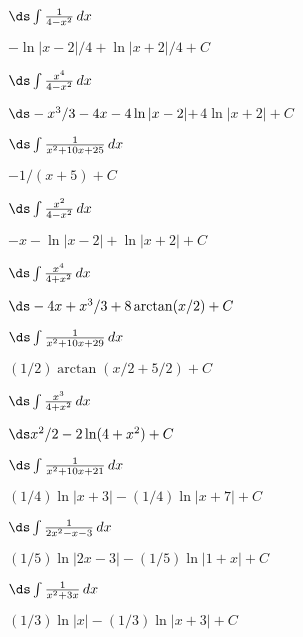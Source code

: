 \begin{enumialphparenastyle}

\begin{ex}
 $\ds\int {1\over 4-x^2}\,dx$
\begin{sol}
 $-\ln|x-2|/4+\ln|x+2|/4+C$
\end{sol}
\end{ex}

\begin{ex}
 $\ds\int {x^4\over 4-x^2}\,dx$
\begin{sol}
 $\ds -x^3/3-4x-4\ln|x-2|+$\hfill\break$4\ln|x+2| +C$
\end{sol}
\end{ex}

\begin{ex}
 $\ds\int {1\over x^2+10x+25}\,dx$
\begin{sol}
 $-1/(x+5) +C$
\end{sol}
\end{ex}

\begin{ex}
 $\ds\int {x^2\over 4-x^2}\,dx$
\begin{sol}
 $-x-\ln|x-2|+\ln|x+2| +C$
\end{sol}
\end{ex}

\begin{ex}
 $\ds\int {x^4\over 4+x^2}\,dx$
\begin{sol}
 $\ds -4x+x^3/3+8\arctan(x/2) +C$
\end{sol}
\end{ex}

\begin{ex}
 $\ds\int {1\over x^2+10x+29}\,dx$
\begin{sol}
 $(1/2)\arctan(x/2+5/2) +C$
\end{sol}
\end{ex}

\begin{ex}
 $\ds\int {x^3\over 4+x^2}\,dx$
\begin{sol}
 $\ds x^2/2-2\ln(4+x^2) +C$
\end{sol}
\end{ex}

\begin{ex}
 $\ds\int {1\over x^2+10x+21}\,dx$
\begin{sol}
 $(1/4)\ln|x+3|-(1/4)\ln|x+7| +C$
\end{sol}
\end{ex}

\begin{ex}
 $\ds\int {1\over 2x^2-x-3}\,dx$
\begin{sol}
 $(1/5)\ln|2x-3|-(1/5)\ln|1+x| +C$
\end{sol}
\end{ex}

\begin{ex}
 $\ds\int {1\over x^2+3x}\,dx$
\begin{sol}
 $(1/3)\ln|x|-(1/3)\ln|x+3| +C$
\end{sol}
\end{ex}

\end{enumialphparenastyle}